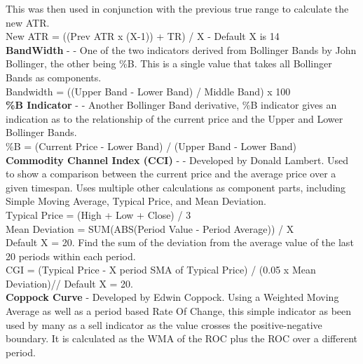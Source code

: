 \documentclass[12pt,a4paper]{article}
\begin{document}
\noindent
This was then used in conjunction with the previous true range to calculate the new ATR.\\

\noindent
New ATR = ((Prev ATR x (X-1)) + TR) / X - Default X is 14 \\

\iffalse
[]
\fi

\noindent
\textbf{BandWidth} - \cite{Murphy1999} - One of the two indicators derived from Bollinger Bands by John Bollinger, the other being \%B. This is a single value that takes all Bollinger Bands as components.\\
\noindent
Bandwidth = ((Upper Band - Lower Band) / Middle Band) x 100 \\

\iffalse
[]
\fi

\noindent
\textbf{\%B Indicator} - \cite{Murphy1999} - Another Bollinger Band derivative, \%B indicator gives an indication as to the relationship of the current price and the Upper and Lower Bollinger Bands. \\
\noindent
\%B = (Current Price - Lower Band) / (Upper Band - Lower Band)\\

\iffalse
[]
\fi

\noindent
\textbf{Commodity Channel Index (CCI)} - \cite{Lambert1980} - Developed by Donald Lambert. Used to show a comparison between the current price and the average price over a given timespan. Uses multiple other calculations as component parts, including Simple Moving Average, Typical Price, and Mean Deviation.\\

\noindent
Typical Price = (High + Low + Close) / 3\\

\noindent
Mean Deviation = SUM(ABS(Period Value - Period Average)) / X\\
Default X = 20. Find the sum of the deviation from the average value of the last 20 periods within each period. \\

\noindent
CGI = (Typical Price - X period SMA of Typical Price) / (0.05 x Mean Deviation)//
Default X = 20.\\

\iffalse
[]
\fi

\noindent
\textbf{Coppock Curve} - Developed by Edwin Coppock. Using a Weighted Moving Average as well as a period based Rate Of Change, this simple indicator as been used by many as a sell indicator as the value crosses the positive-negative boundary. It is calculated as the WMA of the ROC plus the ROC over a different period.\\
\end{document}
